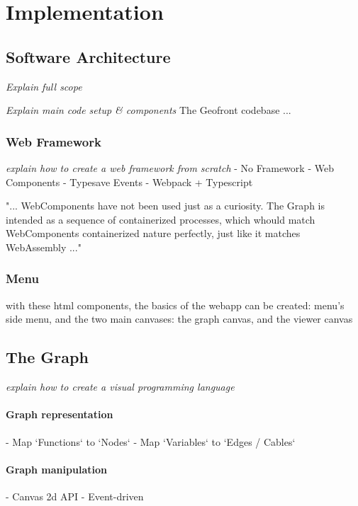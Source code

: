 \chapter{Implementation}%

\section{Software Architecture}

\emph{Explain full scope}


\emph{Explain main code setup \& components}
The Geofront codebase ...

\subsection{Web Framework}
\emph{explain how to create a web framework from scratch}
- No Framework
- Web Components
- Typesave Events
- Webpack + Typescript

"...
WebComponents have not been used just as a curiosity. 
The Graph is intended as a sequence of containerized processes, which whould match WebComponents containerized nature perfectly, just like it matches WebAssembly
..."


\subsection{Menu}
with these html components, the basics of the webapp can be created: menu's side menu, and the two main canvases: the graph canvas, and the viewer canvas 

\section{The Graph}
\emph{explain how to create a visual programming language}
\subsubsection*{Graph representation}
  - Map `Functions` to `Nodes` 
  - Map `Variables` to `Edges / Cables`
\subsubsection*{Graph manipulation}
  - Canvas 2d API
  - Event-driven
